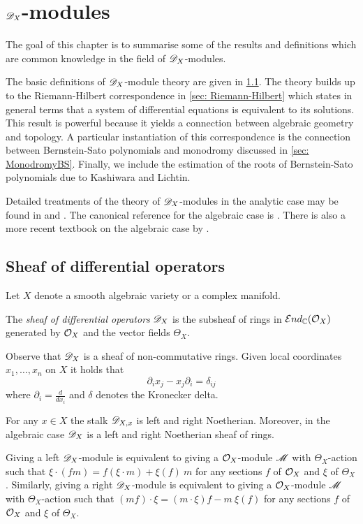 \chapter{$\mathscr{D}_X$-modules}\label{Ch: ChapterDX}
The goal of this chapter is to summarise some of the results and definitions which are common knowledge in the field of $\mathscr{D}_X$-modules.

The basic definitions of $\mathscr{D}_X$-module theory are given in \cref{sec: SheafOfDiff}.
The theory builds up to the Riemann-Hilbert correspondence in \cref{sec: Riemann-Hilbert} which states in general terms that a system of differential equations is equivalent to its solutions.
This result is powerful because it yields a connection between algebraic geometry and topology.
A particular instantiation of this correspondence is the connection between Bernstein-Sato polynomials and monodromy discussed in \cref{sec: MonodromyBS}.
Finally, we include the estimation of the roots of Bernstein-Sato polynomials due to Kashiwara and Lichtin.

Detailed treatments of the theory of $\mathscr{D}_X$-modules in the analytic case may be found in  \cite{bjork1979rings} and \cite{kashiwara2003d}. 
The canonical reference for the algebraic case is \cite{borel1987algebraic}. 
There is also a more recent textbook on the algebraic case by \cite{hotta2007d}.
\section{Sheaf of differential operators}\label{sec: SheafOfDiff}
Let $X$ denote a smooth algebraic variety or a complex manifold.
\begin{definition}
  The {\it sheaf of differential operators} $\mathscr{D}_X$ is the subsheaf of rings in $\mathcal{E}nd_{\mathbb{C}}(\mathcal{O}_X)$ generated by $\mathcal{O}_X$ and the vector fields $\Theta_X$.
\end{definition}
Observe that $\mathscr{D}_X$ is a sheaf of non-commutative rings.
Given local coordinates $x_1,\ldots, x_n$ on $X$ it holds that
$$\partial_i x_j - x_j\partial_i = \delta_{ij} $$
where $\partial_i= \frac{d}{dx_i}$ and $\delta$ denotes the Kronecker delta.
\begin{lemma}{\cite[Proposition 1.4.6., Theorem 4.1.2]{hotta2007d}}
  For any $x\in X$ the stalk $\mathscr{D}_{X,x}$ is left and right Noetherian. Moreover, in the algebraic case $\mathscr{D}_X$ is a left and right Noetherian sheaf of rings.
\end{lemma}
Giving a left $\mathscr{D}_X$-module is equivalent to giving a $\mathcal{O}_X$-module $\mathscr{M}$ with $\Theta_X$-action such that
$\xi\cdot (fm) = f (\xi \cdot m)  + \xi(f)\ m  $
for any sections $f$ of $\mathcal{O}_X$ and $\xi$ of $\Theta_X$. Similarly, giving a right $\mathscr{D}_X$-module is equivalent to giving a $\mathcal{O}_X$-module $\mathscr{M}$ with $\Theta_X$-action such that
$(mf)\cdot\xi = (m\cdot\xi)f - m\ \xi(f) $ for any sections $f$ of $\mathcal{O}_X$ and $\xi$ of $\Theta_X$.

